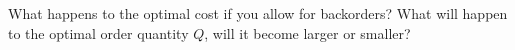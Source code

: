 \begin{exercise}
  What happens to the optimal cost if you allow for backorders?  What
  will happen to the optimal order quantity $Q$, will it become larger or smaller? 
  \begin{comment}
    The cost must become lower, since we remove a constraint. 

    Let's see by how much.  This is not so simple, however, because we
    now have two `controls' (or degrees of freedom): the order
    quantity $Q$ and the backorder level $B$. Even though it is
    possible to find a closed form solution for the optimal values of
    $Q$ and $B$, here we satisfy ourselves with a graphical analysis.
    We are going to make a plot of the total cost as a function of $Q$
    for various values of $B$.

    Here is an example. Take $A=100$, $h=0.2$, $D=20$, $B=10$, $b=1$.

\begin{center}
\begin{tikzpicture}[x=0.02cm,y=0.06cm,
declare function = {
f(\Q) = \D*\A/\Q+\h/2*(\Q-\B)/\Q*(\Q-\B)+\b/2*\B/\Q*\B; }
]
\small
\def\A{100} 
\def\h{0.2} 
\def\D{20} 
\def\b{1}
\draw[thick,->] (50,-2) -- (470,-2) node[right] {$Q$};
\draw[thick,->] (50,-2) -- (50,75) node[above] {Cost};
\def\B{0}
\draw[color=red,thick,domain=60:400] plot (\x,{f(\x)}) node[right] {$B=\B$};
\def\B{30}
\draw[color=blue,thick,domain=60:400] plot (\x,{f(\x)}) node[right] {$B=\B$};
\def\B{60}
\draw[color=green,thick,domain=60:400] plot (\x,{f(\x)}) node[below] {$B=\B$};
\end{tikzpicture}
\end{center}


We see that the curve related to $B=30$, i.e., the
blue curve, achieves the lowest point of each of the three graphs.
The minimum of the blue curve is realized a bit to the right of the
minimum of the $B=0$ curve, i.e., the red curve.  Thus, from the
graphs, by setting $B=30$ and $Q$ a bit larger than the optimal value
for the EOQ model, we can lower the cost a bit.


\end{comment}
\end{exercise}

